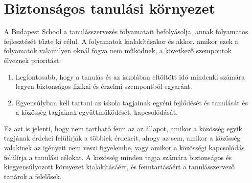 \section{Biztonságos tanulási környezet}

A Budapest School a tanulásszervezés folyamatait befolyásolja, annak folyamatos
fejlesztését tűzte ki célul. A folyamatok kialakításakor és akkor, amikor ezek
a folyamatok valamilyen oknál fogva nem működnek, a következő szempontok
élveznek prioritást:

\begin{enumerate}

  \item Legfontosabb, hogy a tanulás és az iskolában eltöltött idő mindenki
        számára legyen biztonságos fizikai és érzelmi szempontból egyaránt.

  \item Egyensúlyban kell tartani az iskola  tagjainak egyéni fejlődését és
        tanulását és a közösség tagjainak együttműködését, kapcsolódását.

\end{enumerate}
Ez azt is jelenti, hogy nem tartható fenn az az állapot, amikor a közösség
egyik tagjának érdekei felülírják a többiek érdekeit, ahogy az sem, amikor a
közösség valakinek az igényeit nem veszi figyelembe, vagy amikor a közösségi
kapcsolódás felülírja a tanulási célokat. A közösség minden tagja számára
biztonságos és kiegyensúlyozott környezet kialakításáért, és fenntartásáért a
tanulásszervező tanárok a felelősek.